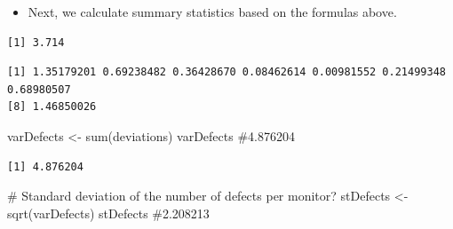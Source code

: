 \documentclass[
  letterpaper,
  DIV=11,
  numbers=noendperiod]{scrreprt}
\newenvironment{Shaded}{\begin{snugshade}}{\end{snugshade}}
\newcommand{\CommentTok}[1]{\textcolor[rgb]{0.37,0.37,0.37}{#1}}
\newcommand{\DecValTok}[1]{\textcolor[rgb]{0.68,0.00,0.00}{#1}}
\newcommand{\FunctionTok}[1]{\textcolor[rgb]{0.28,0.35,0.67}{#1}}
\newcommand{\NormalTok}[1]{\textcolor[rgb]{0.00,0.23,0.31}{#1}}
\newcommand{\OtherTok}[1]{\textcolor[rgb]{0.00,0.23,0.31}{#1}}
\newcommand{\SpecialCharTok}[1]{\textcolor[rgb]{0.37,0.37,0.37}{#1}}
\providecommand{\tightlist}{%
  \setlength{\itemsep}{0pt}\setlength{\parskip}{0pt}}\usepackage{longtable,booktabs,array}
\begin{document}
\begin{itemize}
\tightlist
\item
  Next, we calculate summary statistics based on the formulas above.
\end{itemize}

\begin{Shaded}
\end{Shaded}

\begin{verbatim}
[1] 3.714
\end{verbatim}

\begin{Shaded}
\end{Shaded}

\begin{verbatim}
[1] 1.35179201 0.69238482 0.36428670 0.08462614 0.00981552 0.21499348 0.68980507
[8] 1.46850026
\end{verbatim}

\begin{Shaded}
\begin{Highlighting}[]
\NormalTok{varDefects }\OtherTok{\textless{}{-}} \FunctionTok{sum}\NormalTok{(deviations)}
\NormalTok{varDefects  }\CommentTok{\#4.876204}
\end{Highlighting}
\end{Shaded}

\begin{verbatim}
[1] 4.876204
\end{verbatim}

\begin{Shaded}
\begin{Highlighting}[]
\CommentTok{\# Standard deviation of the number of defects per monitor?}
\NormalTok{stDefects }\OtherTok{\textless{}{-}} \FunctionTok{sqrt}\NormalTok{(varDefects)}
\NormalTok{stDefects  }\CommentTok{\#2.208213}
\end{Highlighting}
\end{Shaded}
\end{document}
